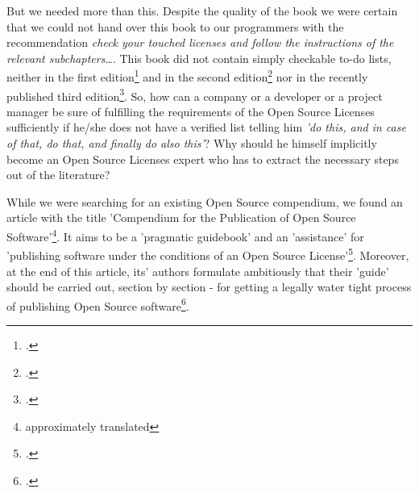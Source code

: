 But we needed more than this. Despite the quality of the book we were certain
that we could not hand over this book to our programmers with the recommendation
\textit{check your touched licenses and follow the instructions of the relevant
subchapters\ldots}. This book did not contain simply checkable to-do lists,
neither in the first edition\footcite[cf.][VIff]{JaeMet2002a} and in the second
edition\footcite[cf.][VIIff]{JaeMet2006a} nor in the recently published third
edition\footcite[cf.][VIIIff. Naturally we use this latest edition for adopting
or discussing systematical aspects]{JaeMet2011a}. So, how can a company or a
developer or a project manager be sure of fulfilling the requirements of the
Open Source Licenses sufficiently if he/she does not have a verified list
telling him \textit{'do this, and in case of that, do that, and finally do also
this'}? Why should he himself implicitly become an Open Source Licenses expert
who has to extract the necessary steps out of the literature?

While we were searching for an existing Open Source compendium, we found an
article with the title 'Compendium for the Publication of Open Source
Software'\footnote{approximately translated}. It aims to be a 'pragmatic
guidebook' and an 'assistance' for 'publishing software under the conditions of
an Open Source License'\footcite[cf.][166f (originally: ein
\enquote{pragmatischer Ratgeber} zur \enquote{Veröffentlichung einer Software
unter den Rahmenbedingungen einer Open-Source-Lizenz}) ]{BreGlaGra2008a}.
Moreover, at the end of this article, its' authors formulate ambitiously that
their 'guide' should be carried out, section by section - for getting a legally
water tight process of publishing Open Source software\footcite[cf.][186
(originally: ein \enquote{Ratgeber}, der es erlaubt \enquote{ (\ldots) die zu
berücksichtigende Aspekte (strukturiert abzuarbeiten) (\ldots) } und einen
\enquote{rechtlich nicht angreifbaren Veröffentlichungsprozess} zu
ermöglichen) ]{BreGlaGra2008a}.

